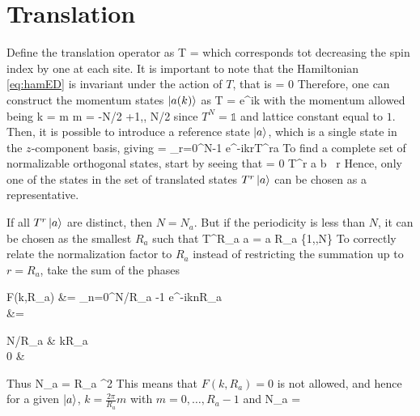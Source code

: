     \section{Translation}

    	Define the translation operator as
    	\be T  =  \ee
    	which corresponds tot decreasing the spin index by one at each site. It is important to note that the Hamiltonian \eqref{eq:hamED} is invariant under the action of $T$, that is
    	\be [\mc H, T] = 0 \label{eq:commuteEDHT} \ee
    	Therefore, one can construct the momentum states $\ket{a(k)}$ as
    	\be T  = e^{ik}  \ee
    	with the momentum allowed being
    	\be k = m  m = -N/2 +1,\dotsc, N/2 \ee
    	since $T^N=\mathbb 1$ and lattice constant equal to $1$. Then, it is possible to introduce a reference state $\ket a$, which is a single state in the $z$-component basis, giving
    	\be {} =  \sum_{r=0}^{N-1} e^{-ikr}T^r\ket a \ee
    	To find a complete set of normalizable orthogonal states, start by seeing that 
    	\be {} = 0 \iff T^r \ket a \neq \ket b \ \forall r \ee
    	Hence, only one of the states in the set of translated states $T^r \ket a$ can be chosen as a representative.

    	If all $T^r \ket a$ are distinct, then $N=N_a$. But if the periodicity is less than $N$, it can be chosen as the smallest $R_a$ such that
    	\be T^{R_a} \ket a = \ket a  R_a \in \{1,\dotsc,N\} \ee
    	To correctly relate the normalization factor to $R_a$ instead of restricting the summation up to $r=R_a$, take the sum of the phases
    	\be \begin{split} F(k,R_a) &= \sum_{n=0}^{N/R_a -1} e^{-iknR_a} \\ &= \begin{cases} N/R_a &  kR_a  \pi \\ 0 &  \end{cases} \end{split} \ee
    	Thus
    	\be N_a = R_a ^2 \ee
    	This means that $F(k,R_a)=0$ is not allowed, and hence for a given $\ket a$, $k = \frac{2\pi}{R_a}m$ with $m=0, \dotsc, R_a-1$ and
    	\be N_a = \ee

